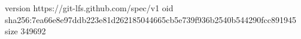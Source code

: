 version https://git-lfs.github.com/spec/v1
oid sha256:7ea66e8e97ddb223e81d262185044665cb5e739f936b2540b544290fcc891945
size 349692
